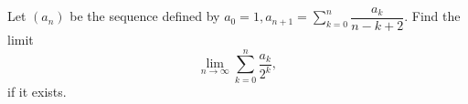 Let $(a_{n})$ be the sequence defined by $a_{0}=1,a_{n+1}=\sum_{k=0}^{n}\dfrac{a_k}{n-k+2}$.
Find the limit
\[\lim_{n \rightarrow \infty} \sum_{k=0}^{n}\dfrac{a_{k}}{2^{k}},\]if it exists.